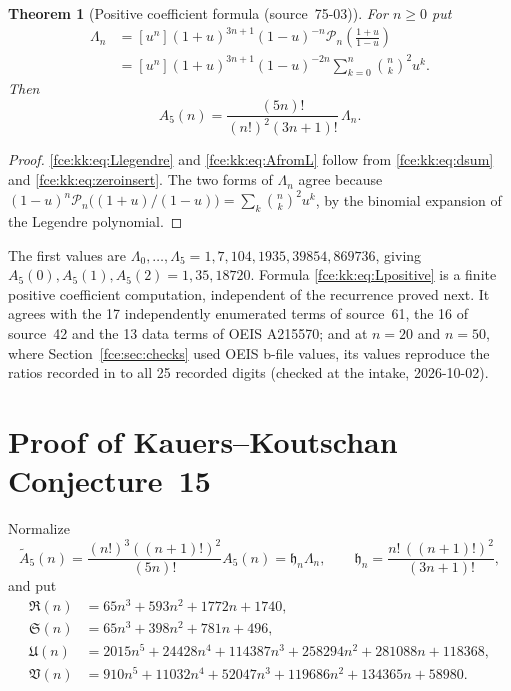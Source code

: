 \documentclass[11pt,a4paper]{article}
\numberwithin{equation}{section}
\newtheorem{theorem}{Theorem}[section]
\theoremstyle{definition}\newtheorem{definition}[theorem]{Definition}
\theoremstyle{remark}\newtheorem{remark}[theorem]{Remark}
\begin{document}
\begin{theorem}[Positive coefficient formula (source~75-03)]\label{fce:kk:thm:coefficient}
For $n\ge0$ put
\begin{align}
 \Lambda_n&=[u^n](1+u)^{3n+1}(1-u)^{-n}
             \mathcal P_n\!\left(\frac{1+u}{1-u}\right)\label{fce:kk:eq:Llegendre}\\
 &=[u^n](1+u)^{3n+1}(1-u)^{-2n}\sum_{k=0}^n\binom nk^2u^k.\label{fce:kk:eq:Lpositive}
\end{align}
Then
\begin{equation}\label{fce:kk:eq:AfromL}
 A_5(n)=\frac{(5n)!}{(n!)^2(3n+1)!}\,\Lambda_n .
\end{equation}
\end{theorem}
\begin{proof}
\eqref{fce:kk:eq:Llegendre} and \eqref{fce:kk:eq:AfromL} follow from
\eqref{fce:kk:eq:dsum} and \eqref{fce:kk:eq:zeroinsert}. The two forms of
$\Lambda_n$ agree because
$(1-u)^n\mathcal P_n\bigl((1+u)/(1-u)\bigr)=\sum_k\binom nk^2u^k$, by the
binomial expansion of the Legendre polynomial.
\end{proof}
The first values are $\Lambda_0,\ldots,\Lambda_5=1,7,104,1935,39854,869736$,
giving $A_5(0),A_5(1),A_5(2)=1,35,18720$. Formula
\eqref{fce:kk:eq:Lpositive} is a finite positive coefficient computation,
independent of the recurrence proved next. It agrees with the 17
independently enumerated terms of source~61, the 16 of source~42 and the
13 data terms of OEIS A215570; and at $n=20$ and $n=50$, where
Section~\ref{fce:sec:checks} used OEIS b-file values, its values reproduce
the ratios recorded in  to all 25
recorded digits (checked at the intake, 2026-10-02).

\section{Proof of Kauers--Koutschan Conjecture~15}\label{fce:kk:sec:recurrence}
Normalize
\begin{equation}\label{fce:kk:eq:normalization}
 \widetilde A_5(n)=\frac{(n!)^3((n+1)!)^2}{(5n)!}A_5(n)=\mathfrak h_n\Lambda_n,
 \qquad \mathfrak h_n=\frac{n!\,((n+1)!)^2}{(3n+1)!},
\end{equation}
and put
\begin{align*}
 \mathfrak R(n)&=65n^3+593n^2+1772n+1740,\\
 \mathfrak S(n)&=65n^3+398n^2+781n+496,\\
 \mathfrak U(n)&=2015n^5+24428n^4+114387n^3+258294n^2+281088n+118368,\\
 \mathfrak V(n)&=910n^5+11032n^4+52047n^3+119686n^2+134365n+58980.
\end{align*}
\end{document}
